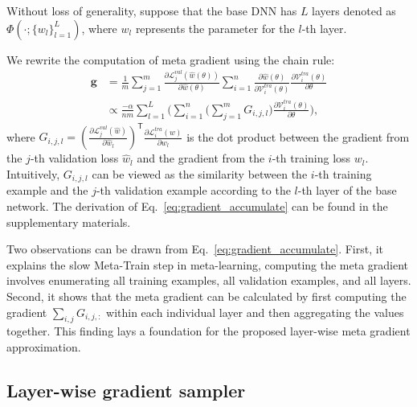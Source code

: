 \documentclass[final]{cvpr}
\begin{document}
Without loss of generality, suppose that the base DNN has $L$ layers denoted as $\Phi(\cdot; \{w_l\}_{l=1}^{L})$, where $w_l$ represents the parameter for the $l$-th layer.

We rewrite the computation of meta gradient using the chain rule:
\begin{equation}\label{eq:gradient_accumulate}
\begin{split}
\mathbf{g} &= \frac{1}{m}\sum_{j=1}^{m}\frac{\partial \mathcal{L}_j^{val}(\hat{w}(\theta))}{\partial \hat{w}(\theta)}
  \sum_{i=1}^{n} \frac{\partial \hat{w}(\theta)}{\partial \mathcal{V}_i^{tra}(\theta)}
              \frac{\partial \mathcal{V}_i^{tra}(\theta)}{\partial \theta} \\
           &\propto \frac{-\alpha}{nm}\sum_{l=1}^{L}
                  \bigg(\sum_{i=1}^{n}\bigg(\sum_{j=1}^{m}G_{i,j,l}\bigg)
                  \frac{\partial \mathcal{V}_i^{tra}(\theta)}{\partial \theta}\bigg), 
\end{split}
\end{equation}
where $G_{i,j,l}= (\frac{\partial \mathcal{L}_j^{val}(\hat{w})}{\partial\hat{w}_l})^{\mathsf{T}}\frac{\partial \mathcal{L}_i^{tra}(w)}{\partial w_l}$ is the dot product between 
the gradient from the $j$-th validation loss \wrt $\hat{w}_l$
and the gradient from the $i$-th training loss \wrt $w_l$.
Intuitively, $G_{i,j,l}$ can be viewed as the similarity between the $i$-th training example and the $j$-th validation example according to the $l$-th layer of the base network. 
The derivation of Eq.~\eqref{eq:gradient_accumulate} can be found in the supplementary materials.


Two observations can be drawn from Eq.~\eqref{eq:gradient_accumulate}. First, it explains the slow Meta-Train step in meta-learning, \ie computing the meta gradient involves enumerating all training examples, all validation examples, and all layers. Second, it shows that the meta gradient can be calculated by first computing the gradient $\sum_{i,j} G_{i,j,:}$ within each individual layer and then aggregating the values together. This finding lays a foundation for the proposed layer-wise meta gradient approximation.



\subsection{Layer-wise gradient sampler}\label{sec:LGSM}
\end{document}
